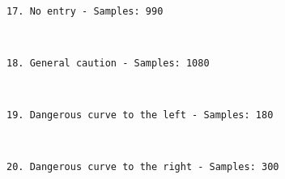 \documentclass[11pt]{article}
\begin{document}
    \begin{center}
    \end{center}
    { \hspace*{\fill} \\}
    
    \begin{Verbatim}[commandchars=\\\{\}]
17. No entry - Samples: 990

    \end{Verbatim}

    \begin{center}
    \end{center}
    { \hspace*{\fill} \\}
    
    \begin{Verbatim}[commandchars=\\\{\}]
18. General caution - Samples: 1080

    \end{Verbatim}

    \begin{center}
    \end{center}
    { \hspace*{\fill} \\}
    
    \begin{Verbatim}[commandchars=\\\{\}]
19. Dangerous curve to the left - Samples: 180

    \end{Verbatim}

    \begin{center}
    \end{center}
    { \hspace*{\fill} \\}
    
    \begin{Verbatim}[commandchars=\\\{\}]
20. Dangerous curve to the right - Samples: 300

    \end{Verbatim}

    \begin{center}
    \end{center}
    { \hspace*{\fill} \\}
    
\end{document}
